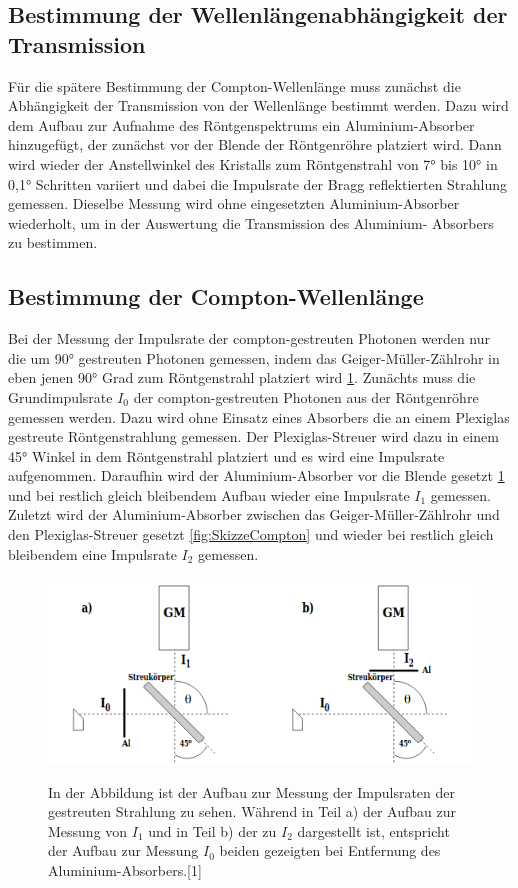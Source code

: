 \documentclass[titlepage = firstcover]{scrartcl}
\begin{document}
        \subsection{Bestimmung der Wellenlängenabhängigkeit der Transmission}
        Für die spätere Bestimmung der Compton-Wellenlänge muss zunächst die Abhängigkeit der Transmission von der Wellenlänge bestimmt werden. Dazu wird dem
        Aufbau zur Aufnahme des Röntgenspektrums ein Aluminium-Absorber hinzugefügt, der zunächst vor der Blende der Röntgenröhre platziert wird. Dann wird 
        wieder der Anstellwinkel des Kristalls zum Röntgenstrahl von 7° bis 10° in 0,1° Schritten variiert und dabei die Impulsrate der Bragg reflektierten
        Strahlung gemessen. Dieselbe Messung wird ohne eingesetzten Aluminium-Absorber wiederholt, um in der Auswertung die Transmission des Aluminium-
        Absorbers zu bestimmen.

        \subsection{Bestimmung der Compton-Wellenlänge}
        Bei der Messung der Impulsrate der compton-gestreuten Photonen werden nur die um 90° gestreuten Photonen gemessen, indem das Geiger-Müller-Zählrohr
        in eben jenen 90° Grad zum Röntgenstrahl platziert wird \ref{fig:SkizzeAbsorber}. 
        Zunächts muss die Grundimpulsrate $I_0$ der compton-gestreuten Photonen aus der Röntgenröhre gemessen werden. Dazu wird ohne Einsatz eines Absorbers
        die an einem Plexiglas gestreute Röntgenstrahlung gemessen. Der Plexiglas-Streuer wird dazu in einem 45° Winkel in dem Röntgenstrahl platziert und es 
        wird eine Impulsrate aufgenommen. Daraufhin wird der Aluminium-Absorber vor die Blende gesetzt \ref{fig:SkizzeAbsorber} und bei restlich gleich bleibendem Aufbau wieder
        eine Impulsrate $I_1$ gemessen. Zuletzt wird der Aluminium-Absorber zwischen das Geiger-Müller-Zählrohr und den Plexiglas-Streuer gesetzt  
        \ref{fig:SkizzeCompton} und wieder bei restlich gleich bleibendem eine Impulsrate $I_2$ gemessen.

        \FloatBarrier
        \begin{figure}[h]
            \centering
            \caption{In der Abbildung ist der Aufbau zur Messung der Impulsraten der gestreuten Strahlung zu sehen. Während in Teil a) der Aufbau zur Messung von $I_1$ und in Teil b) der zu $I_2$ dargestellt ist, entspricht der Aufbau zur Messung $I_0$ beiden gezeigten bei Entfernung des Aluminium-Absorbers.[1]}
            \includegraphics[width = 0.8\linewidth]{absorber.png}
            \label{fig:SkizzeAbsorber}
        \end{figure} 
        \FloatBarrier
        \newpage
\end{document}
